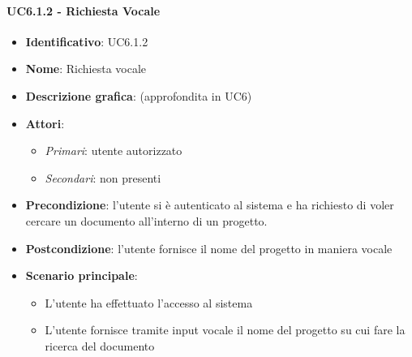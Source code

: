 \paragraph{UC6.1.2 - Richiesta Vocale}
\begin{itemize}
   \item \textbf{Identificativo}: UC6.1.2
   \item \textbf{Nome}: Richiesta vocale
   \item \textbf{Descrizione grafica}: (approfondita in UC6)
   \item \textbf{Attori}:
   \begin{itemize} 
       \item \textit{Primari}: utente autorizzato
       \item \textit{Secondari}: non presenti
   \end{itemize}
       \item \textbf{Precondizione}: l'utente si è autenticato al sistema e ha richiesto di voler cercare un documento all'interno di un progetto.
       \item \textbf{Postcondizione}: l'utente fornisce il nome del progetto in maniera vocale
    \item \textbf{Scenario principale}: 
       \begin{itemize}
           \item L'utente ha effettuato l'accesso al sistema 
           \item L'utente fornisce tramite input vocale il nome del progetto su cui fare la ricerca del documento
       \end{itemize}
\end{itemize}

